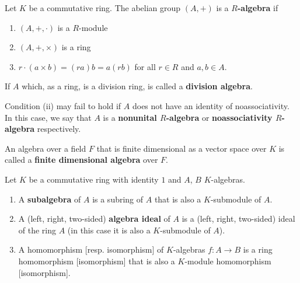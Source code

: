\begin{definition}
    Let $K$ be a commutative ring.
    The abelian group $\left(A,+\right)$ is a \textbf{$R$-algebra} if
    \begin{enumerate}[label=(\roman*)]
        \item
              $(A,+,\cdot)$ is a $R$-module
        \item
              $\left(A,+,\times\right)$ is a ring
        \item
              $r\cdot({a\times b})=(ra) {b}=a({rb})$ for all $r \in R$ and ${a}, {b} \in A$.
    \end{enumerate}
    If $A$ which, as a ring, is a division ring, is called a \textbf{division algebra}.
    \begin{remark}
        Condition (ii) may fail to hold if $A$ does not have an identity of noassociativity.
        In this case, we say that $A$ is a \textbf{nonunital $R$-algebra} or \textbf{noassociativity $R$-algebra} respectively.
    \end{remark}

    An algebra over a field $F$ that is finite dimensional as a vector space over $K$ is called a \textbf{finite dimensional algebra} over $F$.
\end{definition}


\begin{definition}
    Let $K$ be a commutative ring with identity $1$ and $A$, $B$ $K$-algebras.
    \begin{enumerate}
        \item
              A \textbf{subalgebra} of $A$ is a subring of $A$ that is also a $K$-submodule of $A$.

        \item
              A (left, right, two-sided) \textbf{algebra ideal} of $A$ is a (left, right, two-sided) ideal of the ring $A$ (in this case it is also a $K$-submodule of $A$).

        \item
              A homomorphism [resp. isomorphism] of $K$-algebras ${f}: A \rightarrow B$ is a ring homomorphism [isomorphism] that is also a $K$-module homomorphism [isomorphism].
    \end{enumerate}
\end{definition}






